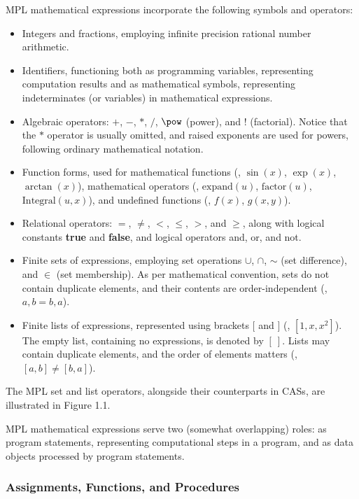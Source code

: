 \ac{MPL} mathematical expressions incorporate the following symbols and operators:
%
\begin{itemize}
  \setlength{\itemsep}{0.0em}
  \item Integers and fractions, employing infinite precision rational number arithmetic.
  \item Identifiers, functioning both as programming variables, representing computation results and as mathematical symbols, representing indeterminates (or variables) in mathematical expressions.
  \item Algebraic operators: $+$, $-$, $*$, $/$, $\pow$ (power), and $!$ (factorial). Notice that the $*$ operator is usually omitted, and raised exponents are used for powers, following ordinary mathematical notation.
  \item Function forms, used for mathematical functions (\eg{}, $\sin(x)$, $\exp(x)$, $\arctan(x)$), mathematical operators (\eg{}, $\text{expand}(u)$, $\text{factor}(u)$, $\text{Integral}(u,x)$), and undefined functions (\eg{}, $f(x)$, $g(x,y)$).
  \item Relational operators: $=$, $\neq$, $<$, $\leq$, $>$, and $\geq$, along with logical constants \textbf{true} and \textbf{false}, and logical operators and, or, and not.
  \item Finite sets of expressions, employing set operations $\cup$, $\cap$, $\sim$ (set difference), and $\in$ (set membership). As per mathematical convention, sets do not contain duplicate elements, and their contents are order-independent (\eg{}, ${a, b} = {b, a}$).
  \item Finite lists of expressions, represented using brackets $[$ and $]$ (\eg{}, $[1, x, x^2]$). The empty list, containing no expressions, is denoted by $[~]$. Lists may contain duplicate elements, and the order of elements matters (\eg{}, $[a, b] \neq [b, a]$).
\end{itemize}
%
The \ac{MPL} set and list operators, alongside their counterparts in \acp{CAS}, are illustrated in Figure 1.1.

\ac{MPL} mathematical expressions serve two (somewhat overlapping) roles: as program statements, representing computational steps in a program, and as data objects processed by program statements.

\subsubsection{Assignments, Functions, and Procedures}

